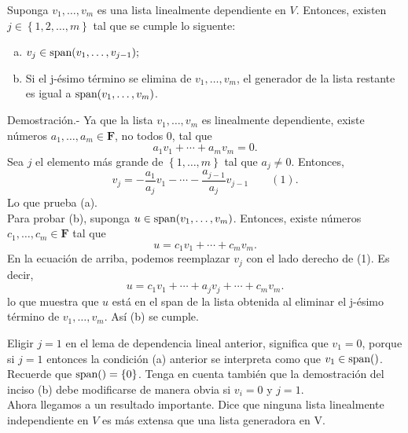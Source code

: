 \setcounter{mylema}{20}
\begin{mylema}
    Suponga $v_1,\ldots,v_m$ es una lista linealmente dependiente en $V$. Entonces, existen $j\in\left\{1,2,\ldots,m\right\}$ tal que se cumple lo siguente:
    \begin{enumerate}[(a)]
	\item $v_j\in \mathop{\mbox{\normalfont span}}\nolimits(v_1,\ldots,v_{j-1});$
	\item Si el j-ésimo término se elimina de $v_1,\ldots,v_m$, el generador de la lista restante es igual a $\mathop{\mbox{\normalfont span}}\nolimits(v_1,\ldots,v_m)$.\\
    \end{enumerate}
    Demostración.-\; Ya que la lista $v_1,\ldots,v_m$ es linealmente dependiente, existe números $a_1,\ldots,a_m\in \textbf{F}$, no todos $0$, tal que
    $$a_1v_1+\cdots + a_mv_m=0.$$
    Sea $j$ el elemento más grande de $\left\{1,\ldots, m\right\}$ tal que $a_j\neq 0$. Entonces,
    $$v_j=-\dfrac{a_1}{a_j}v_1-\cdots-\dfrac{a_{j-1}}{a_j}v_{j-1}\qquad (1).$$
    Lo que prueba (a). \\
    Para probar (b), suponga $u\in \mathop{\mbox{\normalfont span}}\nolimits(v_1,\ldots,v_m)$. Entonces, existe números $c_1,\ldots,c_m\in \textbf{F}$ tal que
    $$u=c_1v_1+\cdots+c_mv_m.$$
    En la ecuación de arriba, podemos reemplazar $v_j$ con el lado derecho de (1). Es decir,
    $$u=c_1v_1+\cdots+a_jv_j+\cdots +c_mv_m.$$
    lo que muestra que $u$ está en el span de la lista obtenida al eliminar el j-ésimo término de $v_1,\ldots,v_m$. Así (b) se cumple.
\end{mylema}

Eligir $j=1$ en el lema de dependencia lineal anterior, significa que $v_1=0$, porque si $j=1$ entonces la condición (a) anterior se interpreta como que $v_1\in \mathop{\mbox{\normalfont span}}\nolimits()$. Recuerde que $\mathop{\mbox{\normalfont span}}\nolimits()=\left\{0\right\}$. Tenga en cuenta también que la demostración del inciso (b) debe modificarse de manera obvia si $v_i=0$ y $j=1$.\\

Ahora llegamos a un resultado importante. Dice que ninguna lista linealmente independiente en $V$ es más extensa que una lista generadora en V.

